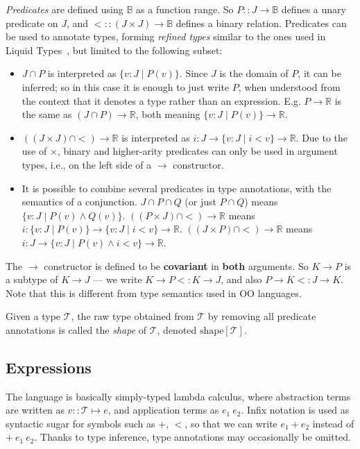 \documentclass{article}
\newcommand\newterm[1]{{\it #1}}
\newcommand\R{\mathbb{R}}
\newcommand\B{\mathbb{B}}
\newcommand\T{\mathcal{T}}
\begin{document}
\medskip
\newterm{Predicates} are defined using $\B$ as a function range. So $P :: J\to\B$ defines a unary predicate
on $J$, and ${<} :: (J\times J)\to\B$ defines a binary relation.
Predicates can be used to annotate types, forming \newterm{refined types} similar to the ones
used in Liquid Types~\cite{PLDI08/Rondon}, but limited to the following subset:
\begin{itemize}
  \item $J\cap P$ is interpreted as $\{v:J\;|\;P(v)\}$. Since $J$ is the domain of $P$, it can be inferred;
    so in this case it is enough to just write $P$, when understood from the context that it denotes a
    type rather than an expression. E.g. $P\to\R$ is the same as $(J\cap P)\to\R$, both meaning
    $\{v:J\;|\;P(v)\}\to\R$.
  \item $((J\times J)\cap {<})\to\R$ is interpreted as $i:J\to\{v:J\;|\;i<v\}\to\R$. Due to the use of $\times$,
    binary and higher-arity predicates can only be used in argument types, i.e., on the left side of a $\to$
    constructor.
  \item It is possible to combine several predicates in type annotations, with the semantics of a conjunction.
    $J\cap P\cap Q$ (or just $P\cap Q$) means $\{v:J\;|\;P(v)\land Q(v)\}$.
    $((P\times J)\cap{<})\to\R$ means $i:\{v:J\;|\;P(v)\}\to\{v:J\;|\;i<v\}\to\R$.
    $((J\times P)\cap{<})\to\R$ means $i:J\to\{v:J\;|\;P(v)\land i<v\}\to\R$.
\end{itemize}

The $\to$ constructor is defined to be {\bf covariant} in {\bf both} arguments. So $K\to P$ is a subtype of $K\to J$
--- we write $K\to P <: K\to J$, and also $P\to K <: J\to K$. 
Note that this is different from type semantics used in OO
languages.

Given a type $\T$, the raw type obtained from $\T$ by removing all predicate annotations
is called the \newterm{shape} of $\T$, denoted $\mathrm{shape}[\T]$.


\subsection{Expressions}

The language is basically simply-typed lambda calculus, where abstraction terms are written as
$v::\T\mapsto e$, and application terms as $e_1\ e_2$. Infix notation is used as syntactic sugar
for symbols such as $+$, $<$, so that we can write $e_1 + e_2$ instead of ${+}\ e_1\ e_2$.
Thanks to type inference, type annotations may occasionally be omitted.
\end{document}
